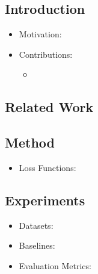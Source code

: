 \documentclass{article}
\begin{document}
    \subsection{Introduction}\label{subsec:Learning_Human_Objectives_by_Evaluating_Hypothetical_Behavior:introduction}
    \begin{itemize}
        \item Motivation:
        \item Contributions:
        \begin{itemize}
            \item
        \end{itemize}
    \end{itemize}

    \subsection{Related Work}\label{subsec:Learning_Human_Objectives_by_Evaluating_Hypothetical_Behavior:related-work}

    \subsection{Method}\label{subsec:Learning_Human_Objectives_by_Evaluating_Hypothetical_Behavior:method}
    \begin{itemize}
        \item Loss Functions:
    \end{itemize}

    \subsection{Experiments}\label{subsec:Learning_Human_Objectives_by_Evaluating_Hypothetical_Behavior:experiments}
    \begin{itemize}
        \item Datasets:
        \item Baselines:
        \item Evaluation Metrics:
    \end{itemize}
\end{document}
